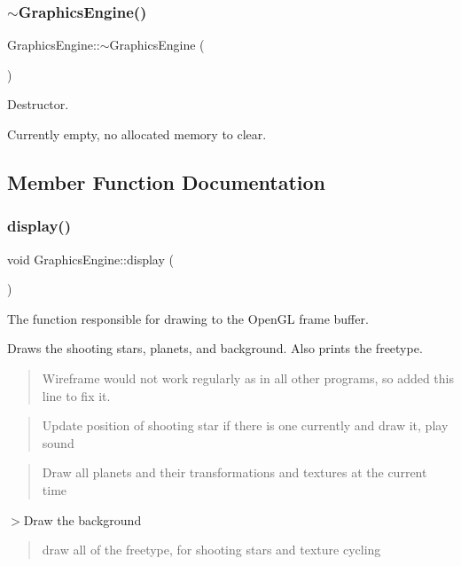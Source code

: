 \subsubsection{\texorpdfstring{$\sim$\+Graphics\+Engine()}{~GraphicsEngine()}}
{\footnotesize\ttfamily Graphics\+Engine\+::$\sim$\+Graphics\+Engine (\begin{DoxyParamCaption}{ }\end{DoxyParamCaption})}



Destructor. 

Currently empty, no allocated memory to clear. 

\subsection{Member Function Documentation}
\mbox{\label{class_graphics_engine_a2f0bdf1a47bf9e8d4f1c9525c2ebc8f9}} 
\subsubsection{\texorpdfstring{display()}{display()}}
{\footnotesize\ttfamily void Graphics\+Engine\+::display (\begin{DoxyParamCaption}{ }\end{DoxyParamCaption})}



The function responsible for drawing to the Open\+GL frame buffer. 

Draws the shooting stars, planets, and background. Also prints the freetype. \begin{quote}
Wireframe would not work regularly as in all other programs, so added this line to fix it. \end{quote}


\begin{quote}
Update position of shooting star if there is one currently and draw it, play sound \end{quote}


\begin{quote}
Draw all planets and their transformations and textures at the current time \end{quote}


$>$Draw the background

\begin{quote}
draw all of the freetype, for shooting stars and texture cycling \end{quote}
\mbox{\label{class_graphics_engine_ac5de239348a9c4acb443bb83eb15bab0}} 
